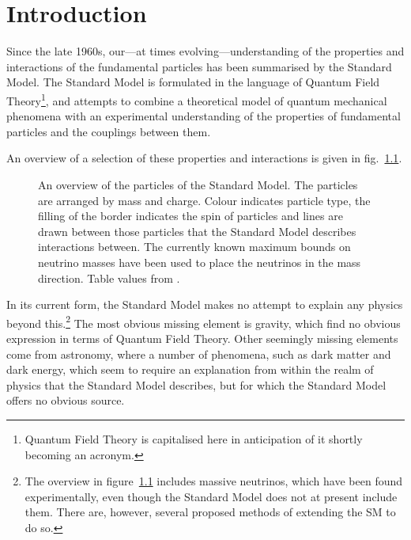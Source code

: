 \frontmatter

\tableofcontents
\mainmatter

\chapter{Introduction}

Since the late 1960s, our---at times evolving---understanding of the properties and interactions of the fundamental particles has been summarised by the Standard Model. The Standard Model is formulated in the language of Quantum Field Theory\footnote{Quantum Field Theory is capitalised here in anticipation of it shortly becoming an acronym.}, and attempts to combine a theoretical model of quantum mechanical phenomena with an experimental understanding of the properties of fundamental particles and the couplings between them.

An overview of a selection of these properties and interactions is given in fig.~\ref{SMsum}.

\begin{figure}[htp]
\begin{minipage}[b]{.745\textwidth}

\end{minipage}
\hfill\begin{minipage}[b]{.25\textwidth}
\caption{An overview of the particles of the Standard Model. The particles are arranged by mass and charge. Colour indicates particle type, the filling of the border indicates the spin of particles and lines are drawn between those particles that the Standard Model describes interactions between. The currently known maximum bounds on neutrino masses have been used to place the neutrinos in the mass direction. Table values from \cite{wikism}.\label{SMsum}}
\end{minipage}
\end{figure}

In its current form, the Standard Model makes no attempt to explain any physics beyond this.\footnote{The overview in figure~\ref{SMsum} includes massive neutrinos, which have been found experimentally, even though the Standard Model does not at present include them. There are, however, several proposed methods of extending the SM to do so.} The most obvious missing element is gravity, which find no obvious expression in terms of Quantum Field Theory. Other seemingly missing elements come from astronomy, where a number of phenomena, such as dark matter and dark energy, which seem to require an explanation from within the realm of physics that the Standard Model describes, but for which the Standard Model offers no obvious source.

